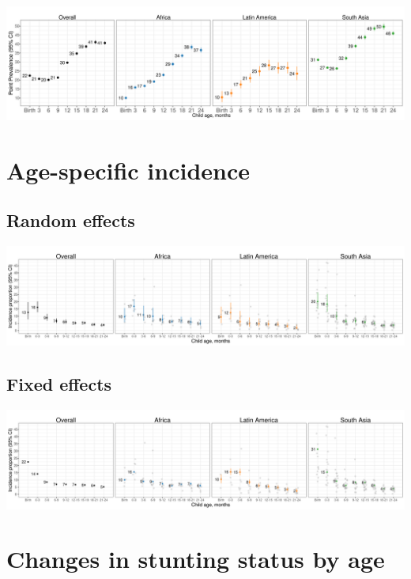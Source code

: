 \documentclass[
  9pt,
]{book}
\begin{document}
\includegraphics[width=58.33in]{figures//stunting/fig-stunt-2-prev-overall_region--allage-fe}

\hypertarget{age-specific-incidence-2}{%
\section{Age-specific incidence}\label{age-specific-incidence-2}}

\hypertarget{random-effects-1}{%
\subsection{Random effects}\label{random-effects-1}}

\includegraphics[width=66.67in]{figures//stunting/fig-stunt-2-inc-overall_region--allage-primary}

\hypertarget{fixed-effects-2}{%
\subsection{Fixed effects}\label{fixed-effects-2}}

\includegraphics[width=66.67in]{figures//stunting/fig-stunt-2-inc-overall_region--allage-fe}

\hypertarget{changes-in-stunting-status-by-age}{%
\section{Changes in stunting status by age}\label{changes-in-stunting-status-by-age}}
\end{document}
